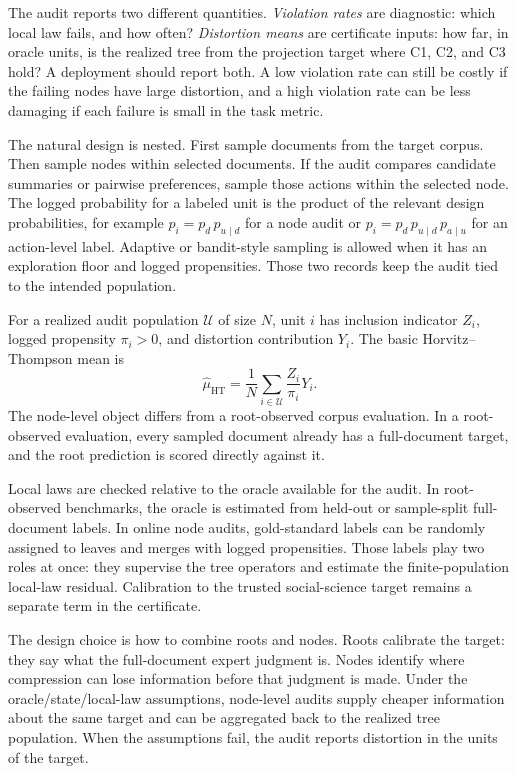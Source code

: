 The audit reports two different quantities. \emph{Violation rates} are
diagnostic: which local law fails, and how often? \emph{Distortion means} are
certificate inputs: how far, in oracle units, is the realized tree from the
projection target where C1, C2, and C3 hold? A deployment should report both.
A low violation rate can still be costly if the failing nodes have large
distortion, and a high violation rate can be less damaging if each failure is
small in the task metric.

The natural design is nested. First sample documents from the target corpus.
Then sample nodes within selected documents. If the audit compares candidate
summaries or pairwise preferences, sample those actions within the selected
node. The logged probability for a labeled unit is the product of the relevant
design probabilities, for example
$p_i=p_d\,p_{u\mid d}$ for a node audit or
$p_i=p_d\,p_{u\mid d}\,p_{a\mid u}$ for an action-level label. Adaptive or
bandit-style sampling is allowed when it has an exploration floor and logged
propensities. Those two records keep the audit tied to the intended
population.

For a realized audit population $\mathcal U$ of size $N$, unit $i$ has
inclusion indicator $Z_i$, logged propensity $\pi_i>0$, and distortion
contribution $Y_i$. The basic Horvitz--Thompson mean is
\[
  \hat\mu_{\mathrm{HT}}
  =
  \frac{1}{N}\sum_{i\in\mathcal U}\frac{Z_i}{\pi_i}Y_i.
\]
The node-level object differs from a root-observed corpus evaluation. In a
root-observed evaluation, every sampled document already has a full-document
target, and the root prediction is scored directly against it.

Local laws are checked relative to the oracle available for the audit. In
root-observed benchmarks, the oracle is estimated from held-out or
sample-split full-document labels. In online node audits, gold-standard labels
can be randomly assigned to leaves and merges with logged propensities. Those
labels play two roles at once: they supervise the tree operators and estimate
the finite-population local-law residual. Calibration to the trusted
social-science target remains a separate term in the certificate.

The design choice is how to combine roots and nodes. Roots calibrate the
target: they say what the full-document expert judgment is. Nodes identify
where compression can lose information before that judgment is made. Under the
oracle/state/local-law assumptions, node-level audits supply cheaper
information about the same target and can be aggregated back to the realized
tree population. When the assumptions fail, the audit reports distortion in
the units of the target.

